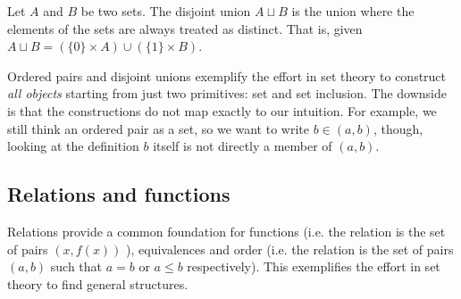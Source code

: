 \documentclass{article}
\begin{document}
\begin{defn}
	Let $A$ and $B$ be two sets. The disjoint union $A \sqcup B$ is the union where the elements of the sets are always treated as distinct. That is, given $A \sqcup B = (\{0\} \times A ) \cup ( \{1\} \times B )$.
\end{defn}

\begin{remark}
	Ordered pairs and disjoint unions exemplify the effort in set theory to construct \emph{all objects} starting from just two primitives: set and set inclusion. The downside is that the constructions do not map exactly to our intuition. For example, we still think an ordered pair as a set, so we want to write $b \in (a, b)$, though, looking at the definition $b$ itself is not directly a member of $(a, b)$.
\end{remark}

\subsection{Relations and functions}

\begin{remark}
	Relations provide a common foundation for functions (i.e. the relation is the set of pairs $(x, f(x))$ ), equivalences and order (i.e. the relation is the set of pairs $(a, b)$ such that $a=b$ or $a\leq b$ respectively). This exemplifies the effort in set theory to find general structures.
\end{remark}
\end{document}
